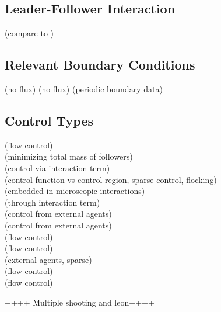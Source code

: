 \documentclass[11pt, a4paper]{article}
\theoremstyle{definition}
\begin{document}
\subsection*{Leader-Follower Interaction}
\cite{albi2016no2}
\cite{Albi_2014no1} (compare to \cite{albi2014kinetic} )
\cite{burger2019instantaneous}

\subsection*{Relevant Boundary Conditions}
\cite{albi2016mean} (no flux)
\cite{carrillo2018no1} (no flux)
\cite{carrillo2019mean} (periodic boundary data)


\subsection*{Control Types}
\cite{albi2016mean} (flow control)\\
\cite{albi2016no2} (minimizing total mass of followers)\\
\cite{albi2014kinetic} (control via interaction term)\\
\cite{albi2016selective} (control function vs control region, sparse control, flocking)\\
\cite{Albi_2014no1}(embedded in microscopic interactions)\\
\cite{burger2019meanfield}  (through interaction term)\\
\cite{burger2019instantaneous} (control from external agents)\\
\cite{burger2016controlling} (control from external agents)\\
\cite{carrillo2019mean} (flow control)\\
\cite{Fornasier_2014} (flow control)\\
\cite{Fornasier_2014no2} (external agents, sparse)\\
\cite{fornasier_lisini_orrieri_savare_2019} (flow control)\\
\cite{piccoli2014no1} (flow control)





++++ Multiple shooting and leon++++
\pagebreak	


\end{document}
